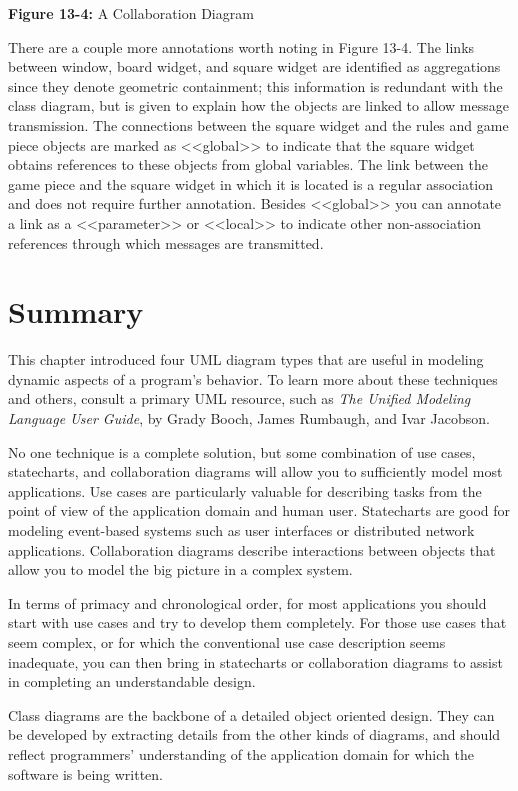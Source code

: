 {\sffamily\bfseries Figure 13-4:}
{\sffamily A Collaboration Diagram}

\bigskip

There are a couple more annotations worth noting in Figure 13-4. The links
between window, board widget, and square widget are identified as aggregations
since they denote geometric containment; this information is redundant with the
class diagram, but is given to explain how the objects are linked to allow
message transmission. The connections between the square widget and the rules
and game piece objects are marked as
{\textless}{\textless}global{\textgreater}{\textgreater} to indicate that the
square widget obtains references to these objects from global variables. The
link between the game piece and the square widget in which it is located is a
regular association and does not require further annotation. Besides
{\textless}{\textless}global{\textgreater}{\textgreater} you can annotate a
link as a {\textless}{\textless}parameter{\textgreater}{\textgreater} or
{\textless}{\textless}local{\textgreater}{\textgreater} to indicate other
non-association references through which messages are transmitted.

\section{Summary}

This chapter introduced four UML diagram types that
are useful in modeling dynamic aspects of a program's behavior. To
learn more about these techniques and others, consult
a primary UML resource, such as
\textit{The Unified Modeling Language User Guide}, by
Grady Booch, James Rumbaugh, and Ivar Jacobson.

No one technique is a complete solution, but some combination of use
cases, statecharts, and collaboration diagrams will allow you to
sufficiently model most applications. Use cases are particularly
valuable for describing tasks from the point of view of the
application domain and human user. Statecharts are good for modeling
event-based systems such as user interfaces or distributed network
applications.  Collaboration diagrams describe interactions between
objects that allow you to model the big picture in a complex system.

In terms of primacy and chronological order, for most applications you should
start with use cases and try to develop them completely. For those use cases
that seem complex, or for which the conventional use case description seems
inadequate, you can then bring in statecharts or collaboration diagrams to
assist in completing an understandable design.

Class diagrams are the backbone of a detailed object oriented design.  They can
be developed by extracting details from the other kinds of diagrams, and should
reflect programmers' understanding of the application domain for which the
software is being written.
